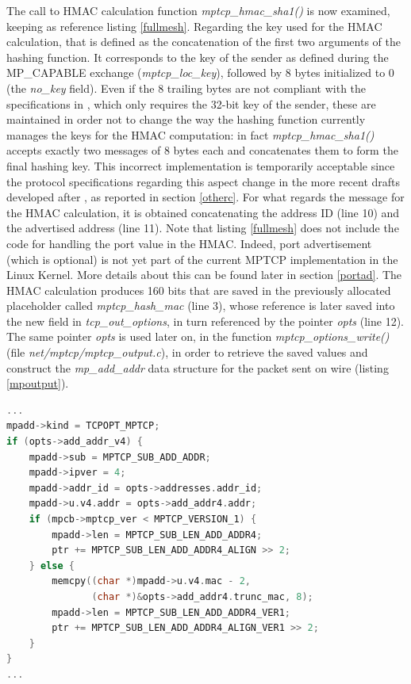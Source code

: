 The call to HMAC calculation function \textit{mptcp\_hmac\_sha1()} is now examined, keeping as reference listing \ref{fullmesh}. Regarding the key used for the HMAC calculation, that is defined as the concatenation of the first two arguments of the hashing function. It corresponds to the key of the sender as defined during the MP\_CAPABLE exchange (\textit{mptcp\_loc\_key}), followed by 8 bytes initialized to 0 (the \textit{no\_key} field). Even if the 8 trailing bytes are not compliant with the specifications in , which only requires the 32-bit key of the sender, these are maintained in order not to change the way the hashing function currently manages the keys for the HMAC computation: in fact \textit{mptcp\_hmac\_sha1()} accepts exactly two messages of 8 bytes each and concatenates them to form the final hashing key. This incorrect implementation is temporarily acceptable since the protocol specifications regarding this aspect change in the more recent drafts developed after , as reported in section \ref{otherc}.
For what regards the message for the HMAC calculation, it is obtained concatenating the address ID (line 10) and the advertised address (line 11). Note that listing \ref{fullmesh} does not include the code for handling the port value in the HMAC. Indeed, port advertisement (which is optional) is not yet part of the current MPTCP implementation in the Linux Kernel. More details about this can be found later in section \ref{portad}. 
The HMAC calculation produces 160 bits that are saved in the previously allocated placeholder called \textit{mptcp\_hash\_mac} (line 3), whose reference is later saved into the new field in \textit{tcp\_out\_options}, in turn referenced by the pointer \textit{opts} (line 12). The same pointer \textit{opts} is used later on, in the function \textit{mptcp\_options\_write()} (file \textit{net/mptcp/mptcp\_output.c}), in order to retrieve the saved values and construct the \textit{mp\_add\_addr} data structure for the packet sent on wire (listing \ref{mpoutput}).

\begin{lstlisting}[language=c, caption=\textit{Building ADD\_ADDR2 output message}, label=mpoutput]
...
mpadd->kind = TCPOPT_MPTCP;
if (opts->add_addr_v4) {
	mpadd->sub = MPTCP_SUB_ADD_ADDR;
	mpadd->ipver = 4;
	mpadd->addr_id = opts->addresses.addr_id;
	mpadd->u.v4.addr = opts->add_addr4.addr;
	if (mpcb->mptcp_ver < MPTCP_VERSION_1) {
		mpadd->len = MPTCP_SUB_LEN_ADD_ADDR4;
		ptr += MPTCP_SUB_LEN_ADD_ADDR4_ALIGN >> 2;
	} else {
		memcpy((char *)mpadd->u.v4.mac - 2,
	           (char *)&opts->add_addr4.trunc_mac, 8);
		mpadd->len = MPTCP_SUB_LEN_ADD_ADDR4_VER1;
		ptr += MPTCP_SUB_LEN_ADD_ADDR4_ALIGN_VER1 >> 2;
	}
}
...
\end{lstlisting}

